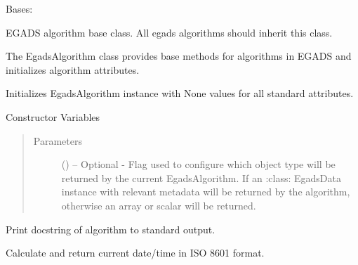 \documentclass[a4paper,10pt,openany,english]{sphinxmanual}
\begin{document}

\begin{fulllineitems}
\label{egadsapi:egads.core.egads_core.EgadsAlgorithm}
Bases: 

EGADS algorithm base class. All egads algorithms should inherit this class.

The EgadsAlgorithm class provides base methods for algorithms in EGADS and
initializes algorithm attributes.

Initializes EgadsAlgorithm instance with None values for all standard
attributes.

Constructor Variables
\begin{quote}\begin{description}
\item[{Parameters}] \leavevmode
{} () -- Optional - 
Flag used to configure which object type will be returned by the current
EgadsAlgorithm. If  an :class: EgadsData instance with relevant
metadata will be returned by the algorithm, otherwise an array or
scalar will be returned.

\end{description}\end{quote}

\begin{fulllineitems}
\label{egadsapi:egads.core.egads_core.EgadsAlgorithm.get_info}
Print docstring of algorithm to standard output.

\end{fulllineitems}


\begin{fulllineitems}
\label{egadsapi:egads.core.egads_core.EgadsAlgorithm.now}
Calculate and return current date/time in ISO 8601 format.

\end{fulllineitems}



\end{fulllineitems}
\end{document}
